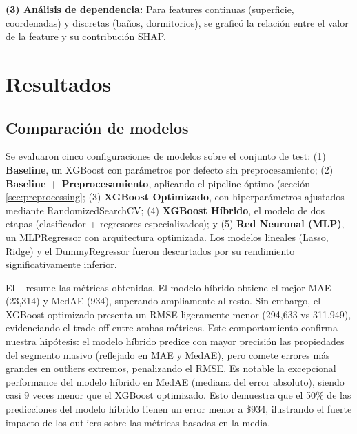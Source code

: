 \documentclass[conference]{IEEEtran}
\begin{document}
\textbf{(3) Análisis de dependencia:} Para features continuas (superficie, coordenadas) y discretas (baños, dormitorios), se graficó la relación entre el valor de la feature y su contribución SHAP.



    \section{Resultados}

    \subsection{Comparación de modelos}

    Se evaluaron cinco configuraciones de modelos sobre el conjunto de test: (1) \textbf{Baseline}, un XGBoost con parámetros por defecto sin preprocesamiento; (2) \textbf{Baseline + Preprocesamiento}, aplicando el pipeline óptimo (sección \ref{sec:preprocessing}; (3) \textbf{XGBoost Optimizado}, con hiperparámetros ajustados mediante RandomizedSearchCV; (4) \textbf{XGBoost Híbrido}, el modelo de dos etapas (clasificador + regresores especializados); y (5) \textbf{Red Neuronal (MLP)}, un MLPRegressor con arquitectura optimizada. Los modelos lineales (Lasso, Ridge) y el DummyRegressor fueron descartados por su rendimiento significativamente inferior.

    El ~ resume las métricas obtenidas. El modelo híbrido obtiene el mejor MAE (23,314) y MedAE (934), superando ampliamente al resto. Sin embargo, el XGBoost optimizado presenta un RMSE ligeramente menor (294,633 vs 311,949), evidenciando el trade-off entre ambas métricas. Este comportamiento confirma nuestra hipótesis: el modelo híbrido predice con mayor precisión las propiedades del segmento masivo (reflejado en MAE y MedAE), pero comete errores más grandes en outliers extremos, penalizando el RMSE. Es notable la excepcional performance del modelo híbrido en MedAE (mediana del error absoluto), siendo casi 9 veces menor que el XGBoost optimizado. Esto demuestra que el 50\% de las predicciones del modelo híbrido tienen un error menor a \$934, ilustrando el fuerte impacto de los outliers sobre las métricas basadas en la media.
\end{document}
